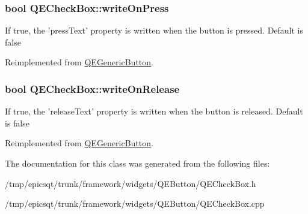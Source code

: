 \hypertarget{classQECheckBox_aa4f1c788edfa6ad9573052d8832e7f37}{
\subsubsection[{writeOnPress}]{\setlength{\rightskip}{0pt plus 5cm}bool QECheckBox::writeOnPress}}
\label{classQECheckBox_aa4f1c788edfa6ad9573052d8832e7f37}
If true, the 'pressText' property is written when the button is pressed. Default is false 

Reimplemented from \hyperlink{classQEGenericButton}{QEGenericButton}.

\hypertarget{classQECheckBox_a0b524a42857130ebc8301c2a8952d5ca}{
\subsubsection[{writeOnRelease}]{\setlength{\rightskip}{0pt plus 5cm}bool QECheckBox::writeOnRelease}}
\label{classQECheckBox_a0b524a42857130ebc8301c2a8952d5ca}
If true, the 'releaseText' property is written when the button is released. Default is false 

Reimplemented from \hyperlink{classQEGenericButton}{QEGenericButton}.



The documentation for this class was generated from the following files:\begin{DoxyCompactItemize}
\item 
/tmp/epicsqt/trunk/framework/widgets/QEButton/QECheckBox.h\item 
/tmp/epicsqt/trunk/framework/widgets/QEButton/QECheckBox.cpp\end{DoxyCompactItemize}

